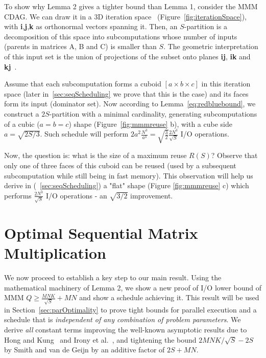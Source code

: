 \documentclass[sigplan,review,anonymous]{acmart}\settopmatter{printfolios=true,printccs=false,printacmref=false}
\begin{document}
To show why Lemma 2 gives a tighter bound than Lemma 1, consider the MMM CDAG.
We can draw it in a 3D iteration
space~\cite{tiling} (Figure~\ref{fig:iterationSpace}), with 
\textbf{i},\textbf{j},\textbf{k} as orthonormal 
vectors spanning it. Then, 
an $S$-partition is a decomposition of this space
into subcomputations whose number of inputs (parents in matrices A, B and C) is 
smaller than $S$. The geometric interpretation of this input set is the union 
of 
projections of the subset onto planes \textbf{ij}, \textbf{ik} and 
\textbf{kj}~\cite{loomisApplied}.

Assume that each subcomputation forms a cuboid $[a \times b \times c]$ in this 
iteration space (later 
in~\cref{sec:seqScheduling} we prove that this is the case) and its faces form 
its input (dominator set).
 Now according to Lemma~\ref{eq:redbluebound}, 
we construct a
$2S$-partition with a minimal cardinality, generating subcomputations of a 
cubic ($a = 
b = c$) shape
(Figure~\ref{fig:mmmreuse} b), with a cube side $a = \sqrt{2S/3}$.
Such schedule will perform $2a^2 \frac{N^3}{a^3} =
\sqrt{\frac{3}{2}}\frac{2N^3}{\sqrt{S}}$ I/O operations. 

Now, the question is: what is the size of a maximum reuse $R(S)$? Observe that 
only one of three faces of this cuboid can be reused (used by a subsequent 
subcomputation while still being in fast memory). This observation will help us 
derive in (~\cref{sec:seqScheduling}) a "flat" shape (Figure \ref{fig:mmmreuse} 
c) which performs
$\frac{2N^3}{\sqrt{S}}$ I/O operations - an $\sqrt{3/2}$ improvement.


\section{\hspace{-0.5em}Optimal Sequential Matrix Multiplication}
\label{sec:seqOptimality}

We now proceed to establish a key step to our main result. Using the 
mathematical machinery of Lemma 2, we show a new proof of I/O lower bound of 
MMM $Q \ge \frac{MNK}{\sqrt{S}} + MN$ and show a schedule achieving it. This 
result will be used in Section~\cref{sec:parOptimality} to prove tight bounds 
for parallel execution and a schedule 
that is \emph{independent of any combination of problem parameters}.
%
We derive \emph{all} constant terms improving the well-known asymptotic
results due to Hong and Kung~\cite{redblue} and Irony et al.~\cite{IronyMMM}, 
and tightening the bound $2MNK/\sqrt{S} - 2S$ by Smith and van de Geijn by
an additive factor of $2S + MN$.
\end{document}
